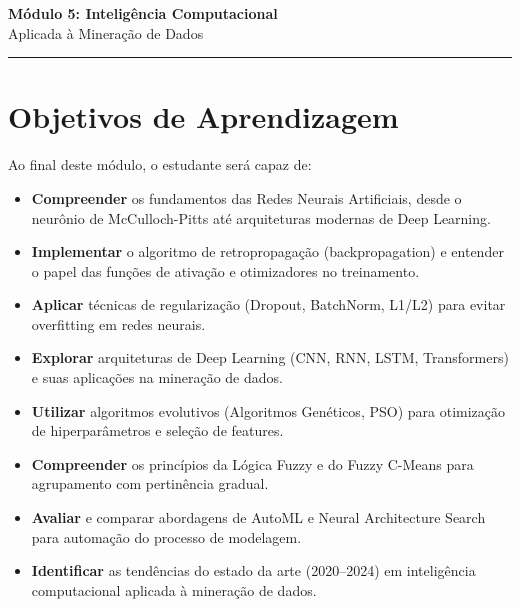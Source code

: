 \documentclass[12pt,a4paper]{article}
\begin{document}
\begin{center}
  {\LARGE\bfseries\color{mineblue} Módulo 5: Inteligência Computacional}\\[0.4em]
  {\large\color{mineorange} Aplicada à Mineração de Dados}\\[0.6em]

  \rule{\linewidth}{0.8pt}
\end{center}

\section{Objetivos de Aprendizagem}

Ao final deste módulo, o estudante será capaz de:

\begin{itemize}[leftmargin=2em]
  \item[\faIcon{check-circle}] \textbf{Compreender} os fundamentos das Redes Neurais Artificiais, desde o neurônio de McCulloch-Pitts até arquiteturas modernas de Deep Learning.
  \item[\faIcon{check-circle}] \textbf{Implementar} o algoritmo de retropropagação (backpropagation) e entender o papel das funções de ativação e otimizadores no treinamento.
  \item[\faIcon{check-circle}] \textbf{Aplicar} técnicas de regularização (Dropout, BatchNorm, L1/L2) para evitar overfitting em redes neurais.
  \item[\faIcon{check-circle}] \textbf{Explorar} arquiteturas de Deep Learning (CNN, RNN, LSTM, Transformers) e suas aplicações na mineração de dados.
  \item[\faIcon{check-circle}] \textbf{Utilizar} algoritmos evolutivos (Algoritmos Genéticos, PSO) para otimização de hiperparâmetros e seleção de features.
  \item[\faIcon{check-circle}] \textbf{Compreender} os princípios da Lógica Fuzzy e do Fuzzy C-Means para agrupamento com pertinência gradual.
  \item[\faIcon{check-circle}] \textbf{Avaliar} e comparar abordagens de AutoML e Neural Architecture Search para automação do processo de modelagem.
  \item[\faIcon{check-circle}] \textbf{Identificar} as tendências do estado da arte (2020--2024) em inteligência computacional aplicada à mineração de dados.
\end{itemize}
\end{document}
